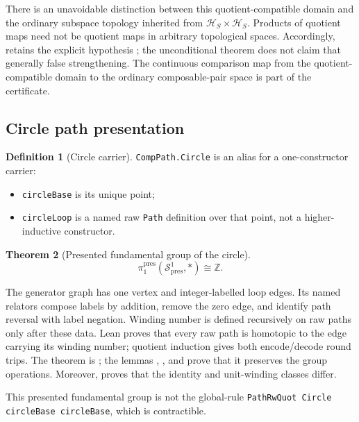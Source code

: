 \documentclass{lmcs}
\theoremstyle{definition}
\newtheorem{definition}{Definition}[section]
\theoremstyle{plain}
\newtheorem{theorem}[definition]{Theorem}
\theoremstyle{remark}
\newcommand{\piOne}{\pi_1}
\newcommand{\ZZ}{\mathbb{Z}}
\begin{document}
There is an unavoidable distinction between this quotient-compatible domain
and the ordinary subspace topology inherited from
\(\mathcal H_S\times\mathcal H_S\).  Products of quotient maps need not be
quotient maps in arbitrary topological spaces.  Accordingly,
 retains the explicit hypothesis
; the unconditional theorem does not claim
that generally false strengthening.  The continuous comparison map from the
quotient-compatible domain to the ordinary composable-pair space is part of
the certificate.

\subsection{Circle path presentation}

\begin{definition}[Circle carrier]
\label{def:circle}
\texttt{CompPath.Circle} is an alias for a one-constructor carrier:
\begin{itemize}
    \item \texttt{circleBase} is its unique point;
    \item \texttt{circleLoop} is a named raw \texttt{Path} definition over that
    point, not a higher-inductive constructor.
\end{itemize}
\end{definition}

\begin{theorem}[Presented fundamental group of the circle]
\label{thm:circle-pi1}
\[
\piOne^{\mathrm{pres}}(\mathcal S^1_{\mathrm{pres}},*)\cong\ZZ.
\]
\end{theorem}

The generator graph has one vertex and integer-labelled loop edges.  Its named
relators compose labels by addition, remove the zero edge, and identify path
reversal with label negation.  Winding number is defined recursively on raw
paths only after these data.  Lean proves that every raw path is homotopic to
the edge carrying its winding number; quotient induction gives both
encode/decode round trips.  The theorem is
; the lemmas
, , and
 prove that it preserves the group
operations.  Moreover,
 proves that the identity and
unit-winding classes differ.

This presented fundamental group is not the global-rule
\texttt{PathRwQuot Circle circleBase circleBase}, which is contractible.
\end{document}

